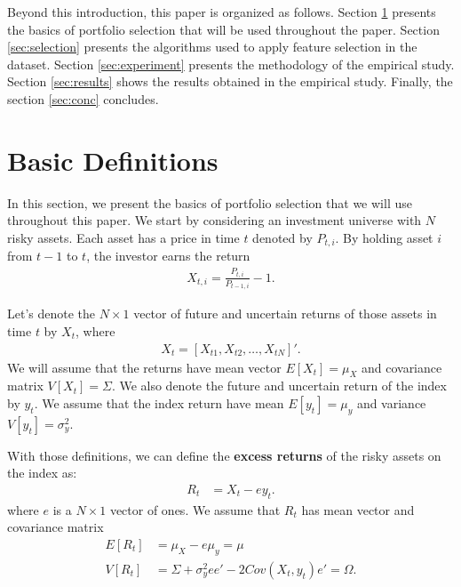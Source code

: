 \documentclass[preprint, doubleblind, authoryear,10pt]{elsarticle}
\begin{document}

Beyond this introduction, this paper is organized as follows.
Section \ref{sec:defs} presents the basics of portfolio selection that will be used throughout the paper.
Section \ref{sec:selection} presents the algorithms used to apply feature selection in the dataset.
Section \ref{sec:experiment} presents the methodology of the empirical study.
Section \ref{sec:results} shows the results obtained in the empirical study.
Finally, the section \ref{sec:conc} concludes.

\section{Basic Definitions} \label{sec:defs}

In this section, we present the basics of portfolio selection that we will use throughout this paper.
We start by considering an investment universe with $N$ risky assets.
Each asset has a price in time $t$ denoted by $P_{t,i}$.
By holding asset $i$ from $t-1$ to $t$, the investor earns the return
\begin{align} \label{eq:ret}
	X_{t,i} = \frac{P_{t,i}}{P_{t-1,i}} - 1.
\end{align}

Let's  denote the $N\times1$ vector of future and uncertain returns of those assets in time $t$ by $X_{t}$, where 
\begin{align*} %
	X_{t} =  [X_{t1}, X_{t2} , \dots, X_{tN}]'.
\end{align*}
We will assume that the returns have mean vector $E[X_{t}] =\mu_{X}$ and covariance matrix $V[X_{t}] =\Sigma$.
We also denote the future and uncertain return of the index by $y_{t}$.
We assume that the index return have mean $E[y_{t}] = \mu_{y}$ and variance $V[y_{t}]=\sigma^2_{y}$.


With those definitions, we can define the \textbf{excess returns} of the risky assets on the index as:
\begin{align*}
	R_{t} &= X_{t} - e y_{t}.
\end{align*}
where $e$ is a $N \times 1$ vector of ones.
We assume that $R_{t}$ has mean vector and covariance matrix 
\begin{align*}
E[R_{t}] &= \mu_{X}-e\mu_{y}=\mu
\\
V[R_{t}] &= \Sigma + \sigma_{y}^{2}ee' - 2Cov(X_{t},y_{t})e' =\Omega.
\end{align*}
\end{document}
